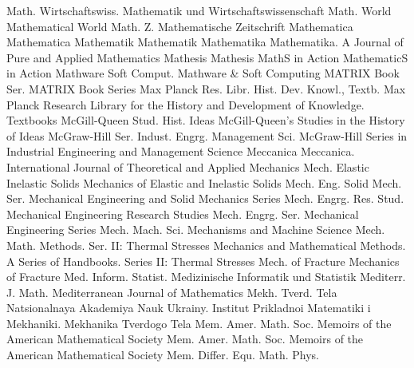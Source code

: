 {Math. Wirtschaftswiss.}
{Mathematik und Wirtschaftswissenschaft}
{Math. World}
{Mathematical World}
{Math. Z.}
{Mathematische Zeitschrift}
{Mathematica}
{Mathematica}
{Mathematik}
{Mathematik}
{Mathematika}
{Mathematika. A Journal of Pure and Applied Mathematics}
{Mathesis}
{Mathesis}
{MathS in Action}
{MathematicS in Action}
{Mathware Soft Comput.}
{Mathware & Soft Computing}
{MATRIX Book Ser.}
{MATRIX Book Series}
{Max Planck Res. Libr. Hist. Dev. Knowl., Textb.}
{Max Planck Research Library for the History and Development of Knowledge. Textbooks}
{McGill-Queen Stud. Hist. Ideas}
{McGill-Queen's Studies in the History of Ideas}
{McGraw-Hill Ser. Indust. Engrg. Management Sci.}
{McGraw-Hill Series in Industrial Engineering and Management Science}
{Meccanica}
{Meccanica. International Journal of Theoretical and Applied Mechanics}
{Mech. Elastic Inelastic Solids}
{Mechanics of Elastic and Inelastic Solids}
{Mech. Eng. Solid Mech. Ser.}
{Mechanical Engineering and Solid Mechanics Series}
{Mech. Engrg. Res. Stud.}
{Mechanical Engineering Research Studies}
{Mech. Engrg. Ser.}
{Mechanical Engineering Series}
{Mech. Mach. Sci.}
{Mechanisms and Machine Science}
{Mech. Math. Methods. Ser. II: Thermal Stresses}
{Mechanics and Mathematical Methods. A Series of Handbooks. Series II: Thermal Stresses}
{Mech. of Fracture}
{Mechanics of Fracture}
{Med. Inform. Statist.}
{Medizinische Informatik und Statistik}
{Mediterr. J. Math.}
{Mediterranean Journal of Mathematics}
{Mekh. Tverd. Tela}
{Natsionalnaya Akademiya Nauk Ukrainy. Institut Prikladnoi Matematiki i Mekhaniki. Mekhanika Tverdogo Tela}
{Mem. Amer. Math. Soc.}
{Memoirs of the American Mathematical Society}
{Mem. Amer. Math. Soc.}
{Memoirs of the American Mathematical Society}
{Mem. Differ. Equ. Math. Phys.}
